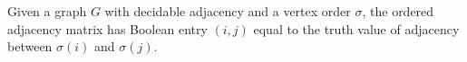 Given a graph \(G\) with decidable adjacency and a vertex order \(\sigma\),
the ordered adjacency matrix has Boolean entry \((i,j)\) equal to the truth
value of adjacency between \(\sigma(i)\) and \(\sigma(j)\).
